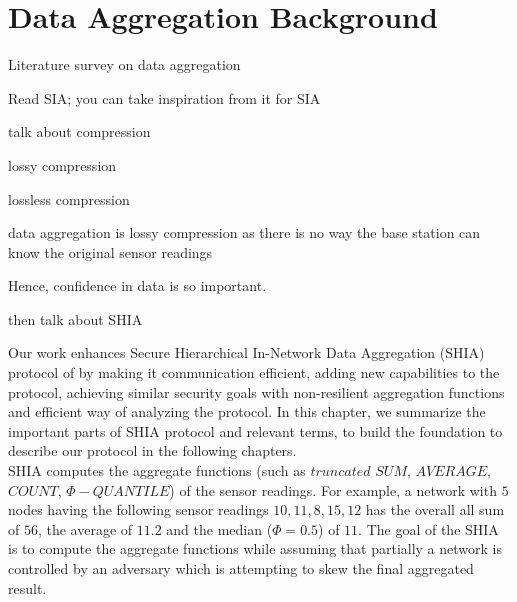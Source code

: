 \chapter{Data Aggregation Background} %
\label{cha:Data Aggregation Background}

Literature survey on data aggregation
	
	Read SIA; you can take inspiration from it for SIA
	 
	talk about compression

	lossy compression

	lossless compression

	data aggregation is lossy compression as there is no way the base station can know the original sensor readings 

	Hence, confidence in data is so important.

then talk about SHIA

Our work enhances Secure Hierarchical In-Network Data Aggregation (SHIA) protocol of \cite{chan2006secure} by making it communication efficient, adding new capabilities to the protocol, achieving similar security goals with non-resilient aggregation functions and efficient way of analyzing the protocol.
In this chapter, we summarize the important parts of SHIA protocol and relevant terms, to build the foundation to describe our protocol in the following chapters.\\
SHIA computes the aggregate functions (such as $\textit{truncated SUM}$, $\textit{AVERAGE}$, $\textit{COUNT}$, $\Phi-QUANTILE$) of the sensor readings.
For example, a network with $5$ nodes having the following sensor readings $10,11,8,15,12$ has the overall all sum of $56$, the average of $11.2$ and the median ($\Phi = 0.5$) of $11$.
The goal of the SHIA is to compute the aggregate functions while assuming that partially a network is controlled by an adversary which is attempting to skew the final aggregated result.

